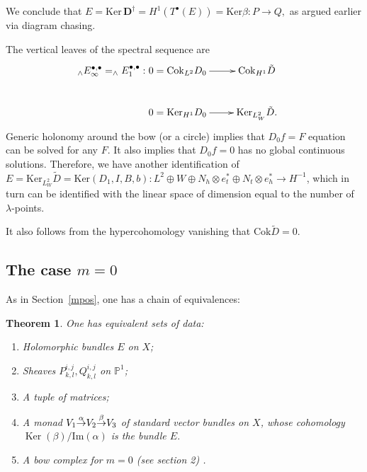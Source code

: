 \documentclass[12pt]{article}
\newtheorem{theorem}{Theorem}[section]
\theoremstyle{definition}
\theoremstyle{remark}
\numberwithin{theorem}{section}
\def\bP{{\mathbb {P}}}
\renewcommand{\ker}{\mathop{\mathrm{Ker}}\nolimits}
\begin{document}
We conclude that $E =\mathrm{Ker}\,\mathbf{D}^\dagger=H^1(T^\bullet(E))=\mathrm{Ker} \beta:P\rightarrow Q,$ as argued earlier via  diagram chasing.

The vertical leaves of the spectral sequence are
\begin{align}
_\wedge E_\infty^{\bullet,\bullet}=_\wedge E_1^{\bullet,\bullet}:&\xymatrix{
0=\mathrm{Cok}_{L^2} D_0\ar[r]&\mathrm{Cok}_{H^1}\tilde{D}\\
0=\mathrm{Ker}_{H^1} D_0\ar[r]&\mathrm{Ker}_{L^2_W}\tilde{D}.
}&
\end{align}
Generic holonomy around the bow (or a circle) implies that $D_0f=F$ equation can be solved for any $F.$  It also implies that $D_0f=0$ has no global continuous solutions.  Therefore, we have another identification of $E =\mathrm{Ker}_{L^2_W}\tilde{D}=\mathrm{Ker} (D_1,I,B,b): L^2\oplus W\oplus N_h\otimes e_t^*\oplus N_t\otimes e_h^*\rightarrow H^{-1}$, which in turn can be identified with the linear space of dimension equal to the number of $\lambda$-points. 

It also follows from the hypercohomology vanishing that $\mathrm{Cok} \tilde{D}=0.$

  \subsection{The case $m=0$}

As in Section~\ref{mpos}, one has  a chain of equivalences:

\begin{theorem} One has equivalent sets of  data:
\begin{enumerate}
\item Holomorphic bundles $E$ on $X$;
\item Sheaves $P^{i,j}_{k,l}, Q^{i,j}_{k,l}$ on $\bP^1$;
\item  A tuple of matrices;
\item  A monad $ V_1 {\buildrel{\alpha }\over{\rightarrow} }V_2 {\buildrel{\beta}\over{\rightarrow}}  V_3$ of standard vector bundles on $X$, whose cohomology $\ker( \beta)/\mathrm{Im}(\alpha)$ is the bundle $E.$
\item A bow complex for $m=0$ (see section 2) .
\end{enumerate}

\end{theorem}
\end{document}
